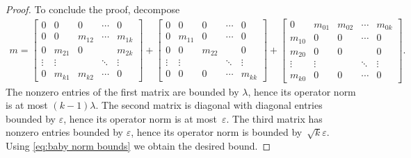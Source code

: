 \documentclass[aos]{imsart}
\theoremstyle{definition}
\numberwithin{equation}{section}
\DeclareMathOperator{\op}{op}
\DeclarePairedDelimiter{\norm}{\lVert}{\rVert}
\newcommand{\eps}{\varepsilon}
\begin{document}
\begin{proof}
To conclude the proof, decompose
\begin{align*}
  m
= \left[\begin{array}{c|cccc}
  0 & 0 & 0 & \cdots & 0 \\
  \hline
  0 & 0 & m_{12} & \cdots & m_{1k} \\
  0 & m_{21} & 0 & & m_{2k} \\
  \vdots & \vdots & & \ddots & \vdots \\
  0 & m_{k1} & m_{k2} & \cdots & 0
  \end{array}\right]
+ \left[\begin{array}{c|cccc}
  0 & 0 & 0 & \cdots & 0 \\
  \hline
  0 & m_{11} & 0 & \cdots & 0 \\
  0 & 0 & m_{22} & & 0 \\
  \vdots & \vdots & & \ddots & \vdots \\
  0 & 0 & 0 & \cdots & m_{kk}
  \end{array}\right]
+ \left[\begin{array}{c|cccc}
  0 & m_{01} & m_{02} & \cdots & m_{0k} \\
  \hline
  m_{10} & 0 & 0 & \cdots & 0 \\
  m_{20} & 0 & 0 & & 0 \\
  \vdots & \vdots & & \ddots & \vdots \\
  m_{k0} & 0 & 0 & \cdots & 0
  \end{array}\right].
\end{align*}
The nonzero entries of the first matrix are bounded by $\lambda$, hence its operator norm is at most $(k-1)\lambda$.
The second matrix is diagonal with diagonal entries bounded by $\eps$, hence its operator norm is at most~$\eps$.
The third matrix has nonzero entries bounded by $\eps$, hence its operator norm is bounded by~$\sqrt k \eps$.
Using \cref{eq:baby norm bounds} we obtain the desired bound.
\end{proof}
\end{document}
